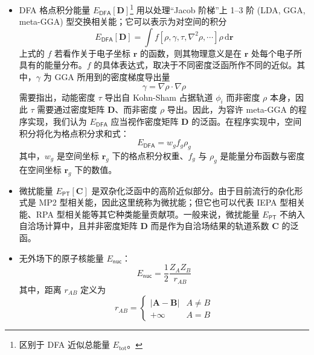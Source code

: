 \begin{itemize}[nosep]
  \item DFA 格点积分能量 $E_\textsf{DFA} [\mathbf{D}]$\footnote{区别于 DFA 近似总能量 $E_\mathrm{tot}$。} 用以处理“Jacob 阶梯”上 1--3 阶 (LDA, GGA, meta-GGA) 型交换相关能；它可以表示为对空间的积分
        \begin{equation}
          E_\textsf{DFA} [\mathbf{D}] = \int f[\rho, \gamma, \tau, \nabla^2 \rho, \cdots] \rho \, \mathrm{d} \bm{r}
        \end{equation}
        上式的 $f$ 若看作关于电子坐标 $\bm{r}$ 的函数，则其物理意义是在 $\bm{r}$ 处每个电子所具有的能量分布。$f$ 的具体表达式，取决于不同密度泛函所作不同的近似。其中，$\gamma$ 为 GGA 所用到的密度梯度导出量
        \begin{equation}
          \gamma = \nabla \rho \cdot \nabla \rho
        \end{equation}
        需要指出，动能密度 $\tau$ 导出自 Kohn-Sham 占据轨道 $\phi_i$ 而非密度 $\rho$ 本身，因此 $\tau$ 需要通过密度矩阵 $\mathbf{D}$、而非密度 $\rho$ 导出。因此，为容许 meta-GGA 的程序实现，我们认为 $E_\textsf{DFA}$ 应当视作密度矩阵 $\mathbf{D}$ 的泛函。在程序实现中，空间积分将化为格点积分求和式：
        \begin{equation}
          E_\textsf{DFA} = w_g f_g \rho_g
        \end{equation}
        其中，$w_g$ 是空间坐标 $\bm{r}_g$ 下的格点积分权重、$f_g$ 与 $\rho_g$ 是能量分布函数与密度在空间坐标 $\bm{r}_g$ 下的数值。
  \item 微扰能量 $E_\textsf{PT}[\mathbf{C}]$ 是双杂化泛函中的高阶近似部分。由于目前流行的杂化形式是 MP2 型相关能，因此这里统称为微扰能；但它也可以代表 IEPA 型相关能、RPA 型相关能等其它种类能量贡献项。一般来说，微扰能量 $E_\textsf{PT}$ 不纳入自洽场计算中，且并非密度矩阵 $\mathbf{D}$ 而是作为自洽场结果的轨道系数 $\mathbf{C}$ 的泛函。
  \item 无外场下的原子核能量 $E_\textsf{nuc}$：
        \begin{equation}
          E_\textsf{nuc} = \frac{1}{2} \frac{Z_A Z_B}{r_{AB}}
        \end{equation}
        其中，距离 $r_{AB}$ 定义为
        \begin{equation*}
          r_{AB} =
          \begin{cases}
              | \boldsymbol{A} - \boldsymbol{B} | & A \neq B \\
              + \infty & A = B
          \end{cases}
        \end{equation*}
\end{itemize}

